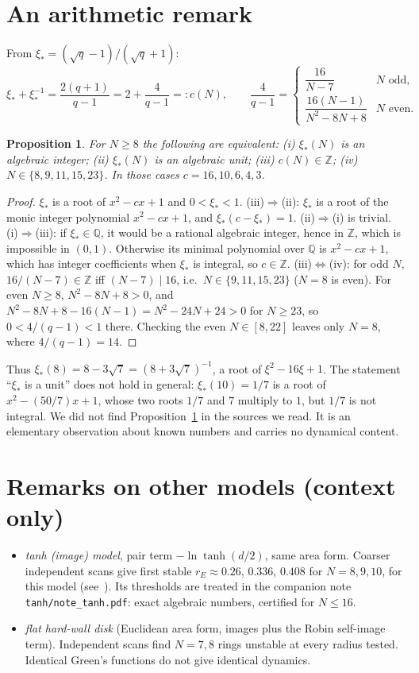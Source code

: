 \documentclass[11pt]{article}
\newtheorem{proposition}[theorem]{Proposition}
\theoremstyle{remark}
\begin{document}
\section{An arithmetic remark}
From $\xi_*=(\sqrt q-1)/(\sqrt q+1)$:
\[
\xi_*+\xi_*^{-1}=\frac{2(q+1)}{q-1}=2+\frac{4}{q-1}=:c(N),\qquad
\frac4{q-1}=\begin{cases}\dfrac{16}{N-7}&N\text{ odd},\\[6pt]
\dfrac{16(N-1)}{N^2-8N+8}&N\text{ even}.\end{cases}
\]
\begin{proposition}\label{prop:units}
For $N\ge8$ the following are equivalent: (i) $\xi_*(N)$ is an algebraic integer; (ii) $\xi_*(N)$ is an
algebraic unit; (iii) $c(N)\in\mathbb Z$; (iv) $N\in\{8,9,11,15,23\}$. In those cases
$c=16,10,6,4,3$.
\end{proposition}
\begin{proof}
$\xi_*$ is a root of $x^2-cx+1$ and $0<\xi_*<1$. (iii)$\Rightarrow$(ii): $\xi_*$ is a root of the monic
integer polynomial $x^2-cx+1$, and $\xi_*(c-\xi_*)=1$. (ii)$\Rightarrow$(i) is trivial.
(i)$\Rightarrow$(iii): if $\xi_*\in\mathbb Q$, it would be a rational algebraic integer, hence in
$\mathbb Z$, which is impossible in $(0,1)$. Otherwise its minimal polynomial over $\mathbb Q$ is
$x^2-cx+1$, which has integer coefficients when $\xi_*$ is integral, so $c\in\mathbb Z$.
(iii)$\Leftrightarrow$(iv): for odd $N$, $16/(N-7)\in\mathbb Z$ iff $(N-7)\mid16$, i.e.\ $N\in\{9,11,15,23\}$
($N=8$ is even). For even $N\ge8$, $N^2-8N+8>0$, and $N^2-8N+8-16(N-1)=N^2-24N+24>0$ for $N\ge23$, so
$0<4/(q-1)<1$ there. Checking the even $N\in[8,22]$ leaves only $N=8$, where $4/(q-1)=14$.
\end{proof}
Thus $\xi_*(8)=8-3\sqrt7=(8+3\sqrt7)^{-1}$, a root of $\xi^2-16\xi+1$. The statement ``$\xi_*$ is a unit''
does not hold in general: $\xi_*(10)=1/7$ is a root of $x^2-(50/7)x+1$, whose two roots $1/7$ and $7$ multiply to $1$, but $1/7$ is not integral.
We did not find Proposition~\ref{prop:units} in the sources we read. It is an elementary observation about
known numbers and carries no dynamical content.

\section{Remarks on other models (context only)}
\begin{itemize}
\item \emph{tanh (image) model}, pair term $-\ln\tanh(d/2)$, same area form. Coarser independent scans
give first stable $r_E\approx0.26$, $0.336$,
$0.408$ for $N=8,9,10$, for this model (see~\cite{MNG,MT}). Its thresholds are
treated in the companion note \texttt{tanh/note\_tanh.pdf}: exact algebraic numbers, certified for $N\le16$.
\item \emph{flat hard-wall disk} (Euclidean area form, images plus the Robin self-image term). Independent
scans find $N=7,8$ rings unstable at every radius
tested. Identical Green's functions do not give identical dynamics.
\end{itemize}
\end{document}
